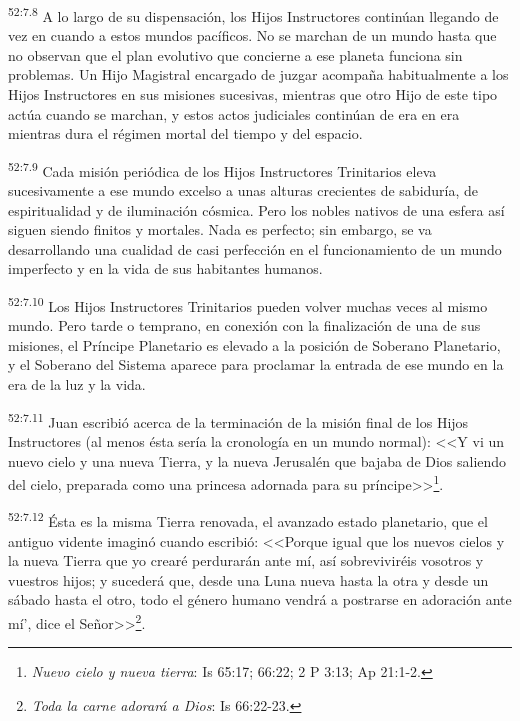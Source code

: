 \par
\textsuperscript{52:7.8} A lo largo de su dispensación, los Hijos Instructores continúan llegando de vez en cuando a estos mundos pacíficos. No se marchan de un mundo hasta que no observan que el plan evolutivo que concierne a ese planeta funciona sin problemas. Un Hijo Magistral encargado de juzgar acompaña habitualmente a los Hijos Instructores en sus misiones sucesivas, mientras que otro Hijo de este tipo actúa cuando se marchan, y estos actos judiciales continúan de era en era mientras dura el régimen mortal del tiempo y del espacio.

\par
\textsuperscript{52:7.9} Cada misión periódica de los Hijos Instructores Trinitarios eleva sucesivamente a ese mundo excelso a unas alturas crecientes de sabiduría, de espiritualidad y de iluminación cósmica. Pero los nobles nativos de una esfera así siguen siendo finitos y mortales. Nada es perfecto; sin embargo, se va desarrollando una cualidad de casi perfección en el funcionamiento de un mundo imperfecto y en la vida de sus habitantes humanos.

\par
\textsuperscript{52:7.10} Los Hijos Instructores Trinitarios pueden volver muchas veces al mismo mundo. Pero tarde o temprano, en conexión con la finalización de una de sus misiones, el Príncipe Planetario es elevado a la posición de Soberano Planetario, y el Soberano del Sistema aparece para proclamar la entrada de ese mundo en la era de la luz y la vida.

\par
\textsuperscript{52:7.11} Juan escribió acerca de la terminación de la misión final de los Hijos Instructores (al menos ésta sería la cronología en un mundo normal): <<Y vi un nuevo cielo y una nueva Tierra, y la nueva Jerusalén que bajaba de Dios saliendo del cielo, preparada como una princesa adornada para su príncipe>>\footnote{\textit{Nuevo cielo y nueva tierra}: Is 65:17; 66:22; 2 P 3:13; Ap 21:1-2.}.

\par
\textsuperscript{52:7.12} Ésta es la misma Tierra renovada, el avanzado estado planetario, que el antiguo vidente imaginó cuando escribió: <<Porque igual que los nuevos cielos y la nueva Tierra que yo crearé perdurarán ante mí, así sobreviviréis vosotros y vuestros hijos; y sucederá que, desde una Luna nueva hasta la otra y desde un sábado hasta el otro, todo el género humano vendrá a postrarse en adoración ante mí', dice el Señor>>\footnote{\textit{Toda la carne adorará a Dios}: Is 66:22-23.}.


